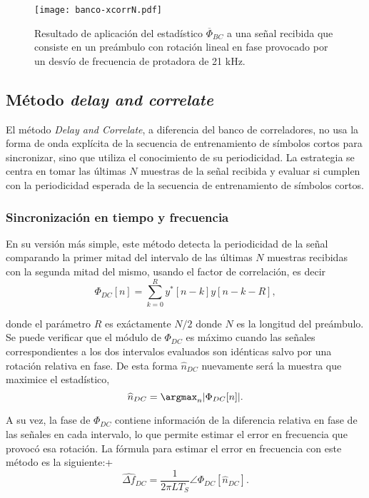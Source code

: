 \begin{figure}[t]
    \centering{}\texttt{[image: banco-xcorrN.pdf]}
    \caption{Resultado de aplicación del estadístico $\overline{\Phi}_{BC}$ a una señal recibida que consiste en un preámbulo con rotación lineal en fase provocado por un desvío de frecuencia de protadora de 21 kHz.\label{fig:banco-xcorrN}}  
\end{figure}


\subsection{Método \textit{delay and correlate}}
\label{S:ch3-dac}

El método \textit{Delay and Correlate}, a diferencia del banco de correladores, no usa la forma de onda explícita de la secuencia de entrenamiento de símbolos cortos para sincronizar, sino que utiliza el conocimiento de su periodicidad. La estrategia se centra en tomar las últimas $N$ muestras de la señal recibida y evaluar si cumplen con la periodicidad esperada de la secuencia de entrenamiento de símbolos cortos. 

\subsubsection{Sincronización en tiempo y frecuencia}
\label{Ss:ch3-dac-principio}

En su versión más simple, este método detecta la periodicidad de la señal comparando la primer mitad del intervalo de las últimas $N$ muestras recibidas con la segunda mitad del mismo, usando el factor de correlación, es decir
\begin{equation}\label{eq:dac-estimator}
    \Phi_{DC}[n] = \sum_{k=0}^{R}y^\ast[n-k]y[n-k-R],
\end{equation}

donde el parámetro $R$ es exáctamente $N/2$ donde $N$ es la longitud del preámbulo. Se puede verificar que el módulo de $\Phi_{DC}$ es máximo cuando las señales correspondientes a los dos intervalos evaluados son idénticas salvo por una rotación relativa en fase. De esta forma $\widehat{n}_{DC}$ nuevamente será la muestra que maximice el estadístico,
\begin{equation}
    \widehat{n}_{DC} = \argmax_n\lvert \Phi_{DC}[n] \lvert.
\end{equation}

A su vez, la fase de $\Phi_{DC}$ contiene información de la diferencia relativa en fase de las señales en cada intervalo, lo que permite estimar el error en frecuencia que provocó esa rotación. La fórmula para estimar el error en frecuencia con este método es la siguiente:+
\begin{equation}\label{eq:freq-est-dac}
    \widehat{\Delta f}_{DC} = \frac{1}{2\pi L T_S}\angle\Phi_{DC}[\widehat{n}_{DC}].
\end{equation}

